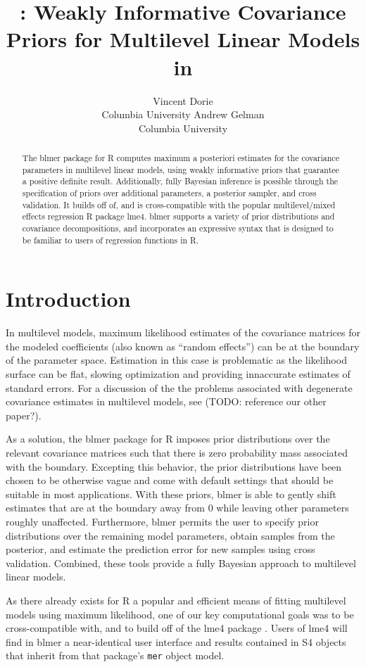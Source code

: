 \documentclass[10pt]{article}
\author{Vincent Dorie\\Columbia University \And
        Andrew Gelman\\Columbia University}
\title{\pkg{blmer}: Weakly Informative Covariance Priors for
  Multilevel Linear Models in \proglang{R}}
\let\proglang=\textsf
\newcommand{\pkg}[1]{{\fontseries{b}\selectfont #1}}
\newcommand{\code}[1]{\texttt{#1}}
\begin{document}
\begin{abstract}
The \pkg{blmer} package for \proglang{R} computes maximum a posteriori estimates for
  the covariance parameters in multilevel linear models, using weakly informative priors
  that guarantee a positive definite result. Additionally, fully
  Bayesian inference is possible through the specification of
  priors over additional parameters, a posterior sampler, and cross validation. It builds off of, and is
  cross-compatible with the popular multilevel/mixed effects
  regression \proglang{R} package \pkg{lme4}. \pkg{blmer} supports a
  variety of prior distributions and covariance decompositions, and
  incorporates an expressive syntax that is designed to be familiar
  to users of regression functions in \proglang{R}.
\end{abstract}

\section{Introduction}

In multilevel models, maximum likelihood estimates of the covariance
matrices for the modeled coefficients (also known as ``random
effects'') can be at the boundary of the parameter
space. Estimation in this case is problematic as the likelihood
surface can be flat, slowing optimization and providing innaccurate
estimates of standard errors. For a discussion of the the problems
associated with degenerate covariance estimates in multilevel
models, see (TODO: reference our other paper?).

As a solution, the \pkg{blmer} package for \proglang{R} \citep{r_team:2010:R} imposes
prior distributions over the relevant covariance matrices such that there is
zero probability mass associated with the boundary. Excepting this
behavior, the prior distributions have been chosen to be otherwise
vague and come with default settings that should be suitable in most applications. With these priors,
\pkg{blmer} is able to gently shift estimates that are at the boundary
away from $0$ while leaving other parameters roughly
unaffected. Furthermore, \pkg{blmer} permits the user to specify
prior distributions over the remaining model parameters, obtain samples from
the posterior, and estimate the prediction error for new
samples using cross validation. Combined, these tools provide a fully Bayesian approach to
multilevel linear models.

As there already exists for \proglang{R} a popular and efficient means
of fitting multilevel models using maximum likelihood, one of our key computational goals was to be
cross-compatible with, and to build off of the \pkg{lme4} package
\citep{bates:2010:lme4}. Users of \pkg{lme4} will find in \pkg{blmer} a
near-identical user interface and results contained in S4 objects that
inherit from that package's \code{mer} object model.
\end{document}
